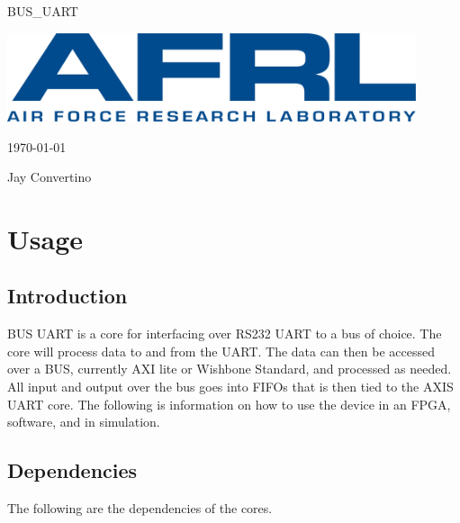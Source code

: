 \begin{titlepage}
  \begin{center}

  {\Huge BUS\_UART}

  \vspace{25mm}

  \includegraphics[width=0.90\textwidth,height=\textheight,keepaspectratio]{img/AFRL.png}

  \vspace{25mm}

  \today

  \vspace{15mm}

  {\Large Jay Convertino}

  \end{center}
\end{titlepage}

\tableofcontents

\newpage

\section{Usage}

\subsection{Introduction}

\par
BUS UART is a core for interfacing over RS232 UART to a bus of choice. The core will process data to and from the UART.
The data can then be accessed over a BUS, currently AXI lite or Wishbone Standard, and processed as needed. All input and output
over the bus goes into FIFOs that is then tied to the AXIS UART core. The following is information on how to use the device
in an FPGA, software, and in simulation.

\subsection{Dependencies}

\par
The following are the dependencies of the cores.

